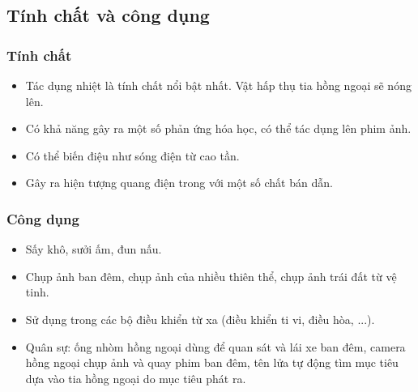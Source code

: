 \subsection{Tính chất và công dụng}

\subsubsection{Tính chất}

\begin{itemize}
	\item  Tác dụng nhiệt là tính chất nổi bật nhất. Vật hấp thụ tia hồng ngoại sẽ nóng lên.
	\item  Có khả năng gây ra một số phản ứng hóa học, có thể tác dụng lên phim ảnh.
	\item  Có thể biến điệu như sóng điện từ cao tần.
	\item  Gây ra hiện tượng quang điện trong với một số chất bán dẫn.
\end{itemize}

\subsubsection{Công dụng}

\begin{itemize}
	\item Sấy khô, sưởi ấm, đun nấu.
	\item Chụp ảnh ban đêm, chụp ảnh của nhiều thiên thể, chụp ảnh trái đất từ vệ tinh.
	\item Sử dụng trong các bộ điều khiển từ xa (điều khiển ti vi, điều hòa, ...).
	\item Quân sự: ống nhòm hồng ngoại dùng để quan sát và lái xe ban đêm, camera hồng ngoại chụp ảnh và quay phim ban đêm, tên lửa tự động tìm mục tiêu dựa vào tia hồng ngoại do mục tiêu phát ra.
\end{itemize}

